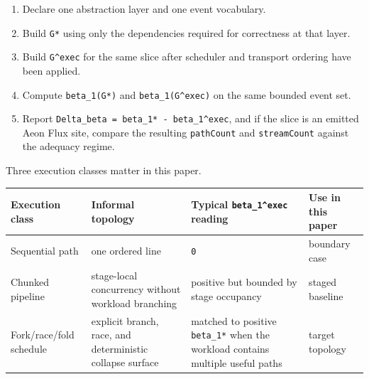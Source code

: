 \documentclass[
  11pt,
]{article}
\newcounter{none} %
\providecommand{\tightlist}{%
  \setlength{\itemsep}{0pt}\setlength{\parskip}{0pt}}
\begin{document}
\begin{enumerate}
\def\labelenumi{\arabic{enumi}.}
\tightlist
\item
  Declare one abstraction layer and one event vocabulary.
\item
  Build \texttt{G*} using only the dependencies required for correctness
  at that layer.
\item
  Build \texttt{G\^{}exec} for the same slice after scheduler and
  transport ordering have been applied.
\item
  Compute \texttt{beta\_1(G*)} and \texttt{beta\_1(G\^{}exec)} on the
  same bounded event set.
\item
  Report \texttt{Delta\_beta\ =\ beta\_1*\ -\ beta\_1\^{}exec}, and if
  the slice is an emitted Aeon Flux site, compare the resulting
  \texttt{pathCount} and \texttt{streamCount} against the adequacy
  regime.
\end{enumerate}

Three execution classes matter in this paper.

{\def\LTcaptype{none} %
\begin{longtable}[]{@{}
  >{\raggedright\arraybackslash}p{}
  >{\raggedright\arraybackslash}p{}
  >{\raggedleft\arraybackslash}p{}
  >{\raggedright\arraybackslash}p{}@{}}
\toprule\noalign{}
\begin{minipage}[b]{\linewidth}\raggedright
Execution class
\end{minipage} & \begin{minipage}[b]{\linewidth}\raggedright
Informal topology
\end{minipage} & \begin{minipage}[b]{\linewidth}\raggedleft
Typical \texttt{beta\_1\^{}exec} reading
\end{minipage} & \begin{minipage}[b]{\linewidth}\raggedright
Use in this paper
\end{minipage} \\
\midrule\noalign{}
\endhead
\bottomrule\noalign{}
\endlastfoot
Sequential path & one ordered line & \texttt{0} & boundary case \\
Chunked pipeline & stage-local concurrency without workload branching &
positive but bounded by stage occupancy & staged baseline \\
Fork/race/fold schedule & explicit branch, race, and deterministic
collapse surface & matched to positive \texttt{beta\_1*} when the
workload contains multiple useful paths & target topology \\
\end{longtable}
}
\end{document}
